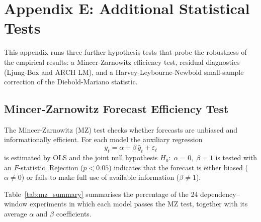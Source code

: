 \section{Appendix E: Additional Statistical Tests}

This appendix runs three further hypothesis tests that probe the robustness of
the empirical results: a Mincer-Zarnowitz efficiency test, residual diagnostics
(Ljung-Box and ARCH LM), and a Harvey-Leybourne-Newbold small-sample correction
of the Diebold-Mariano statistic.

\subsection{Mincer-Zarnowitz Forecast Efficiency Test}

The Mincer-Zarnowitz (MZ) test \cite{mincer1969economic} checks whether forecasts
are unbiased and informationally efficient.
For each model the auxiliary regression
\begin{equation}
    y_t = \alpha + \beta\,\hat{y}_t + \varepsilon_t
\end{equation}
is estimated by OLS and the joint null hypothesis $H_0{:}\;\alpha = 0,\;\beta = 1$
is tested with an $F$-statistic.
Rejection ($p < 0.05$) indicates that the forecast is either biased ($\alpha \neq 0$)
or fails to make full use of available information ($\beta \neq 1$).

Table~\ref{tab:mz_summary} summarises the percentage of the 24
dependency–window experiments in which each model passes the MZ test,
together with its average $\alpha$ and $\beta$ coefficients.

